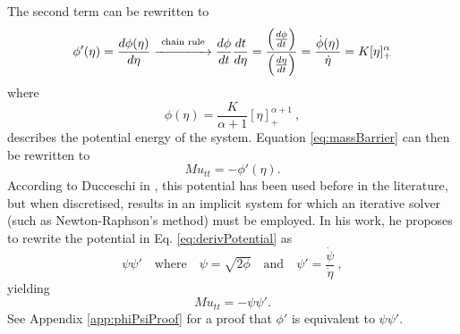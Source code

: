 \documentclass{article}
\begin{document}
\noindent The second term can be rewritten to 
\begin{equation}\label{eq:derivPotential}
    \phi'(\eta) = \frac{d\phi(\eta)}{d\eta}\overset{\text{chain rule}}{\xrightarrow{\hspace*{1.4cm}}}  \frac{d\phi}{dt}\frac{dt}{d\eta} = \frac{\left(\frac{d\phi}{dt}\right)}{\left(\frac{d\eta}{dt}\right)}=\frac{\dot{\phi}(\eta)}{\dot{\eta}} =  K[\eta]_+^\alpha
\end{equation}
where
\begin{equation}\label{eq:potential}
    \phi(\eta) = \frac{K}{\alpha+1}[\eta]_+^{\alpha + 1}\ ,
\end{equation}
describes the potential energy of the system. Equation \eqref{eq:massBarrier} can then be rewritten to
\begin{equation}
    Mu_{tt} = -\phi'(\eta).
\end{equation}
According to Ducceschi in \cite{Ducceschi2019}, this potential has been used before in the literature, but when discretised, results in an implicit system for which an iterative solver (such as Newton-Raphson's method) must be employed. In his work, he proposes to rewrite the potential in Eq. \eqref{eq:derivPotential} as
\begin{equation}
    \psi\psi' \quad \text{where} \quad \psi = \sqrt{2\phi} \quad \text{and} \quad \psi' = \frac{\dot{\psi}}{\dot{\eta}}\ ,
\end{equation}
yielding
\begin{equation}\label{eq:massBarrierPsi}
    Mu_{tt}=-\psi\psi'.
\end{equation}
See Appendix \ref{app:phiPsiProof} for a proof that $\phi'$ is equivalent to $\psi\psi'$.
\end{document}
